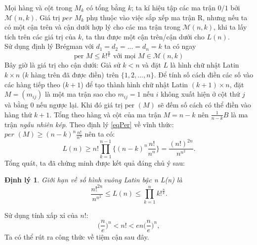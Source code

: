 \documentclass[a4paper, 12pt]{report}
\newtheorem*{theorem}{Định lý } %
\begin{document}
Mọi hàng và cột trong $M_k$ có tổng bằng $k$; ta kí hiệu tập các ma trận $0/1$ bởi $\mathcal{M}(n,k)$. Giá trị $per$ $M_k$ phụ thuộc vào việc sắp xếp ma trận R, nhưng nếu ta có một cận trên và cận dưới hợp lý cho các ma trận trong $\mathcal{M}(n,k)$, khi ta lấy tích trên các giá trị của $k$, ta thu được một cận trên/cận dưới cho $L(n)$.\\
Sử dụng định lý Brégman với $d_1=d_2=...=d_n=k$ ta có ngay
\begin{equation*}
	\textrm{per } M \leq k!^{\frac{n}{k}}		 \textrm{								với mọi      }M \in \mathcal{M}(n,k)
\end{equation*}
Bây giờ là giá trị cho cận dưới: Giả sử $k<n$ và đặt $L$ là hình chữ nhật Latin $k \times n$ ($k$ hàng trên đã được điền) trên $\{1,2,...,n\}$. Để tính số cách điền các số vào các hàng tiếp theo ($k+1$) để tạo thành hình chữ nhật Latin $(k+1) \times n$, đặt $M=(m_{ij})$ là một ma trận sao cho $m_{ij} = 1$ nếu $i$ không xuất hiện ở cột thứ $j$ và bằng $0$ nếu ngược lại. Khi đó giá trị $\textrm{per }(M)$ sẽ đếm số cách có thể điền vào hàng thứ $k+1$. Tổng theo hàng và cột của ma trận $M = n-k$ nên $\frac{1}{n-k}B$ là ma trận \textit{ngẫu nhiên kép}. Theo định lý \eqref{eqPer} về vĩnh thức: $\textit{per }(M) \geq (n-k)^n\frac{n!}{n^n}$ nên ta có:
\begin{equation*}
	L(n) \geq n! \displaystyle\prod_{k=1}^{n-1}\{ (n-k)^{n}\frac{n!}{n^n} \} = \frac{(n!)^{2n}}{n^{n^2}} .
\end{equation*}
Tổng quát, ta đã chứng minh được kết quả đáng chủ ý sau:
\begin{theorem}
	Giới hạn về số hình vuông Latin bậc n L(n) là
	\begin{equation*}
		\frac{n!^{2n}}{n^{n^2}} \leq L(n) \leq \displaystyle \prod_{k=1}^{n} k!^{\frac{n}{k}}.
	\end{equation*}
\end{theorem}

Sử dụng tính xấp xỉ của $n!$:
\begin{equation}
	\Big( \frac{n}{e} \Big)^n < n! < en\Big(\frac{n}{e} \Big)^n, \label{n!}
\end{equation}
Ta có thể rút ra công thức về tiệm cận sau đây.
\end{document}
